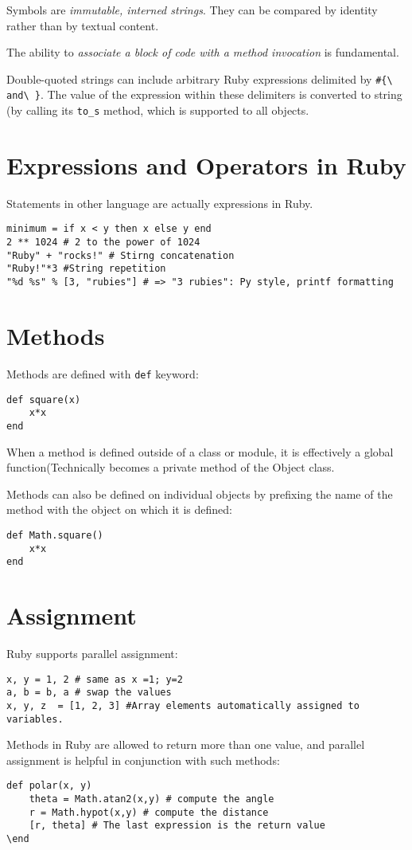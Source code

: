 \documentclass[11pt, a4paper]{book}
\begin{document}
Symbols are \emph{immutable, interned strings}. They can be compared by
identity rather than by textual content.

The ability to \emph{associate a block of code with a method invocation} is
fundamental. 

Double-quoted strings can include arbitrary Ruby expressions delimited by
\verb|#{\ and\ }|. The value of the expression within these delimiters is
converted to string (by calling its \verb|to_s| method, which is supported to
all objects.
\section{Expressions and Operators in Ruby}
Statements in other language are actually expressions in Ruby.
\begin{verbatim}
minimum = if x < y then x else y end
2 ** 1024 # 2 to the power of 1024
"Ruby" + "rocks!" # Stirng concatenation
"Ruby!"*3 #String repetition
"%d %s" % [3, "rubies"] # => "3 rubies": Py style, printf formatting
\end{verbatim}
\section{Methods}
Methods are defined with \verb|def| keyword:
\begin{verbatim}
def square(x)
    x*x
end
\end{verbatim}
When a method is defined outside of a class or module, it is effectively a
global function(Technically becomes a private method of the Object class.

Methods can also be defined on individual objects by prefixing the name of the
method with the object on which it is defined:
\begin{verbatim}
def Math.square()
    x*x
end
\end{verbatim}
\section{Assignment}
Ruby supports parallel assignment:
\begin{verbatim}
x, y = 1, 2 # same as x =1; y=2
a, b = b, a # swap the values
x, y, z  = [1, 2, 3] #Array elements automatically assigned to variables.
\end{verbatim}
Methods in Ruby are allowed to return more than one value, and parallel
assignment is helpful in conjunction with such methods:
\begin{verbatim}
def polar(x, y)
    theta = Math.atan2(x,y) # compute the angle
    r = Math.hypot(x,y) # compute the distance
    [r, theta] # The last expression is the return value
\end
\end{verbatim}
\end{document}
